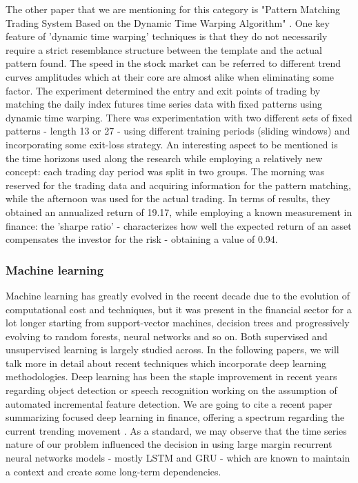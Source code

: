 The other paper that we are mentioning for this category is "Pattern Matching Trading System Based on the Dynamic Time Warping Algorithm" \cite{kim2018pattern}. One key feature of 'dynamic time warping' techniques is that they do not necessarily require a strict resemblance structure between the template and the actual pattern found. The speed in the stock market can be referred to different trend curves amplitudes which at their core are almost alike when eliminating some factor. The experiment determined the entry and exit points of trading by matching the daily index futures time series data with fixed patterns using dynamic time warping. There was experimentation with two different sets of fixed patterns - length 13 or 27 - using different training periods (sliding windows) and incorporating some exit-loss strategy. An interesting aspect to be mentioned is the time horizons used along the research while employing a relatively new concept: each trading day period was split in two groups. The morning was reserved for the trading data and acquiring information for the pattern matching, while the afternoon was used for the actual trading. In terms of results, they obtained an annualized return of 19.17, while employing a known measurement in finance: the 'sharpe ratio' - characterizes how well the expected return of an asset compensates the investor for the risk - obtaining a value of 0.94.

\subsubsection{Machine learning}

Machine learning has greatly evolved in the recent decade due to the evolution of computational cost and techniques, but it was present in the financial sector for a lot longer starting from support-vector machines, decision trees and progressively evolving to random forests, neural networks and so on. Both supervised and unsupervised learning is largely studied across. In the following papers, we will talk more in detail about recent techniques which incorporate deep learning methodologies. Deep learning has been the staple improvement in recent years regarding object detection or speech recognition working on the assumption of automated incremental feature detection. We are going to cite a recent paper summarizing focused deep learning in finance, offering a spectrum regarding the current trending movement \cite{sezer2020financial}. As a standard, we may observe that the time series nature of our problem influenced the decision in using large margin recurrent neural networks models - mostly LSTM and GRU - which are known to maintain a context and create some long-term dependencies.

